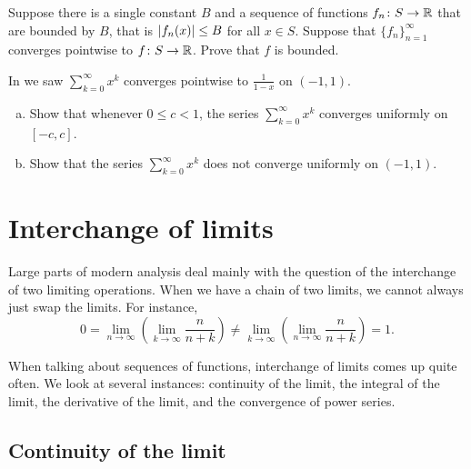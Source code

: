 \begin{exercise}
Suppose there is a single constant $B$ and
a sequence of functions
$f_n \colon S \to {\mathbb{R}}$ that are bounded by $B$,
that is $\left\lvert {f_n(x)} \right\rvert \leq B$ for all $x \in S$.
Suppose that $\{ f_n \}_{n=1}^\infty$ converges pointwise
to $f \colon S \to {\mathbb{R}}$.
Prove that $f$ is bounded.
\end{exercise}

\begin{exercise}
In  we saw
$\sum_{k=0}^\infty x^k$ converges pointwise to $\frac{1}{1-x}$ on
$(-1,1)$.
\begin{enumerate}[a)]
\item
Show that whenever $0 \leq c < 1$, the series
$\sum_{k=0}^\infty x^k$ converges uniformly on $[-c,c]$.
\item
Show that the series $\sum_{k=0}^\infty x^k$ does not converge uniformly
on $(-1,1)$.
\end{enumerate}
\end{exercise}


\sectionnewpage
\section{Interchange of limits}
\label{sec:liminter}


Large parts of modern analysis deal mainly with the question of the
interchange of two limiting operations.  When
we have a chain of two limits, we cannot always just swap the limits.
For instance,
\begin{equation*}
0 = 
\lim_{n\to\infty}
\left(
\lim_{k\to\infty}
\frac{n}{n + k}
\right)
\not=
\lim_{k\to\infty}
\left(
\lim_{n\to\infty}
\frac{n}{n + k}
\right)
= 1 .
\end{equation*}

When talking about sequences of functions, interchange of limits comes up
quite often.  We look at several instances: continuity of the limit, the
integral of the limit, the derivative of the limit, and the convergence of
power series.

\subsection{Continuity of the limit}

